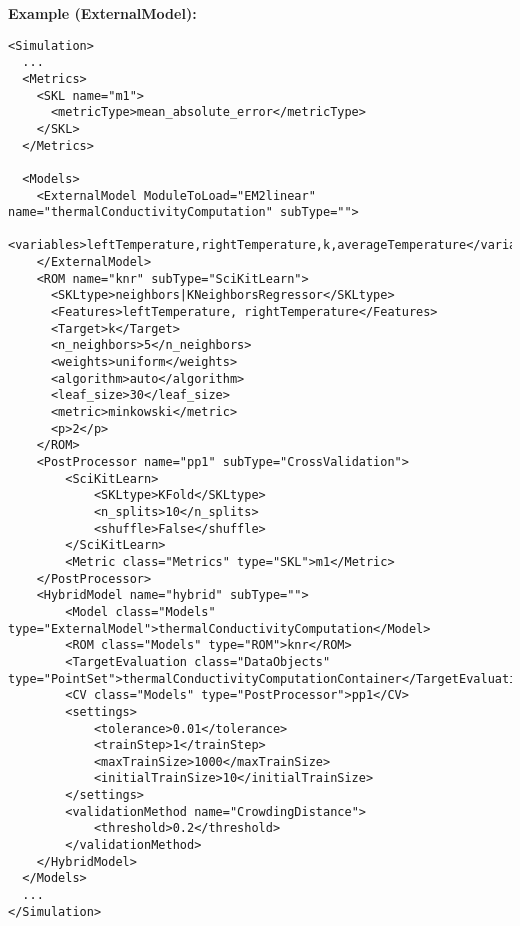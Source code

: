 \textbf{Example (ExternalModel):}
\begin{lstlisting}[style=XML,morekeywords={subType,debug,name,class,type}]
<Simulation>
  ...
  <Metrics>
    <SKL name="m1">
      <metricType>mean_absolute_error</metricType>
    </SKL>
  </Metrics>

  <Models>
    <ExternalModel ModuleToLoad="EM2linear" name="thermalConductivityComputation" subType="">
      <variables>leftTemperature,rightTemperature,k,averageTemperature</variables>
    </ExternalModel>
    <ROM name="knr" subType="SciKitLearn">
      <SKLtype>neighbors|KNeighborsRegressor</SKLtype>
      <Features>leftTemperature, rightTemperature</Features>
      <Target>k</Target>
      <n_neighbors>5</n_neighbors>
      <weights>uniform</weights>
      <algorithm>auto</algorithm>
      <leaf_size>30</leaf_size>
      <metric>minkowski</metric>
      <p>2</p>
    </ROM>
    <PostProcessor name="pp1" subType="CrossValidation">
        <SciKitLearn>
            <SKLtype>KFold</SKLtype>
            <n_splits>10</n_splits>
            <shuffle>False</shuffle>
        </SciKitLearn>
        <Metric class="Metrics" type="SKL">m1</Metric>
    </PostProcessor>
    <HybridModel name="hybrid" subType="">
        <Model class="Models" type="ExternalModel">thermalConductivityComputation</Model>
        <ROM class="Models" type="ROM">knr</ROM>
        <TargetEvaluation class="DataObjects" type="PointSet">thermalConductivityComputationContainer</TargetEvaluation>
        <CV class="Models" type="PostProcessor">pp1</CV>
        <settings>
            <tolerance>0.01</tolerance>
            <trainStep>1</trainStep>
            <maxTrainSize>1000</maxTrainSize>
            <initialTrainSize>10</initialTrainSize>
        </settings>
        <validationMethod name="CrowdingDistance">
            <threshold>0.2</threshold>
        </validationMethod>
    </HybridModel>
  </Models>
  ...
</Simulation>

\end{lstlisting}

